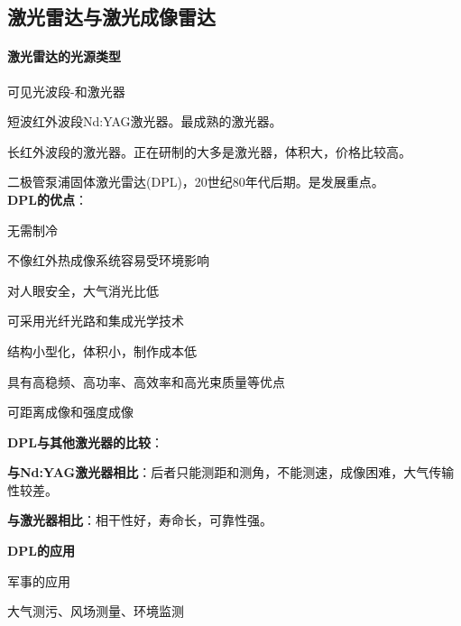 \subsection{激光雷达与激光成像雷达}
\paragraph{激光雷达的光源类型}\begin{itemize*}
	\item 可见光波段-和激光器
	\item 短波红外波段Nd:YAG激光器。最成熟的激光器。
	\item 长红外波段的激光器。正在研制的大多是激光器，体积大，价格比较高。
	\item 二极管泵浦固体激光雷达(DPL)，20世纪80年代后期。是发展重点。\\
	\textbf{DPL的优点}：\begin{itemize*}
		\item 无需制冷
		\item 不像红外热成像系统容易受环境影响
		\item 对人眼安全，大气消光比低
		\item 可采用光纤光路和集成光学技术
		\item 结构小型化，体积小，制作成本低
		\item 具有高稳频、高功率、高效率和高光束质量等优点
		\item 可距离成像和强度成像
	\end{itemize*}
	\textbf{DPL与其他激光器的比较}：\begin{itemize*}
		\item \textbf{与Nd:YAG激光器相比}：后者只能测距和测角，不能测速，成像困难，大气传输性较差。
		\item \textbf{与激光器相比}：相干性好，寿命长，可靠性强。
	\end{itemize*}
	\textbf{DPL的应用}\begin{itemize*}
		\item 军事的应用
		\item 大气测污、风场测量、环境监测
	\end{itemize*}
\end{itemize*}
